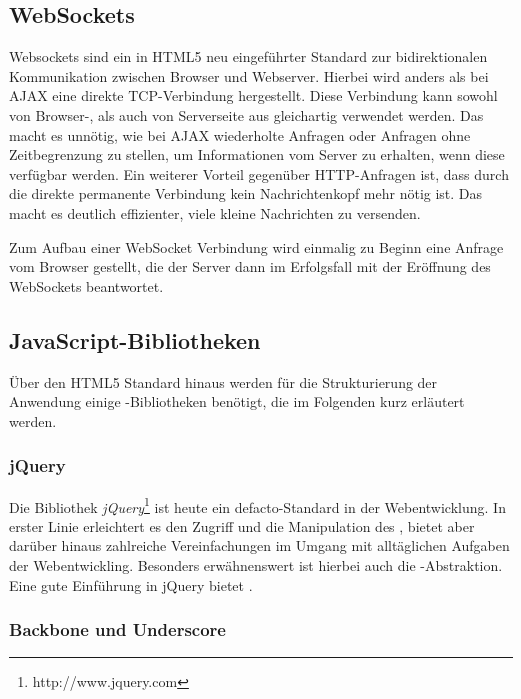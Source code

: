 \subsection{WebSockets}

Websockets sind ein in HTML5 neu eingeführter Standard zur bidirektionalen  Kommunikation zwischen
Browser und Webserver. Hierbei wird anders als bei  AJAX eine direkte TCP-Verbindung hergestellt.
Diese Verbindung kann sowohl von  Browser-, als auch von Serverseite aus gleichartig verwendet
werden. Das macht es  unnötig, wie bei AJAX wiederholte Anfragen oder Anfragen ohne Zeitbegrenzung
zu  stellen, um Informationen vom Server zu erhalten, wenn diese verfügbar werden. Ein weiterer
Vorteil gegenüber HTTP-Anfragen ist, dass durch die direkte permanente Verbindung kein
Nachrichtenkopf mehr nötig ist. Das macht es deutlich  effizienter, viele kleine Nachrichten zu
versenden.

Zum Aufbau einer WebSocket Verbindung wird einmalig zu Beginn eine  Anfrage vom Browser
gestellt, die der Server dann im Erfolgsfall mit der Eröffnung des WebSockets beantwortet.
\cite{websockets}

\clearpage

\subsection{JavaScript-Bibliotheken}

Über den HTML5 Standard hinaus werden für die Strukturierung der Anwendung einige
-Bibliotheken benötigt, die im Folgenden kurz erläutert werden.

\subsubsection{jQuery}

Die Bibliothek \textit{jQuery}\footnote{http://www.jquery.com} ist heute ein defacto-Standard in der
Webentwicklung. In erster Linie erleichtert es den Zugriff und die Manipulation des ,
bietet aber darüber hinaus zahlreiche Vereinfachungen im Umgang mit alltäglichen Aufgaben der
Webentwickling. Besonders erwähnenswert ist hierbei auch die -Abstraktion. Eine gute
Einführung in jQuery bietet \cite{jquery}.

\subsubsection{Backbone und Underscore}

